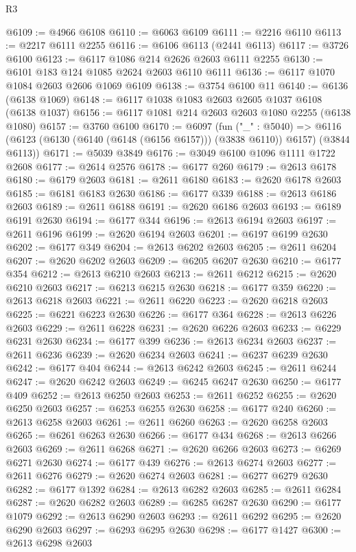 \begin{lexlean}{R3}
\begin{coremodule}
@6109 := @4966 @6108
@6110 := @6063 @6109
@6111 := @2216 @6110
@6113 := @2217 @6111 @2255
@6116 := @6106 @6113 (@2441 @6113)
@6117 := @3726 @6100
@6123 := @6117 @1086 @214 @2626 @2603 @6111 @2255
@6130 := @6101 @183 @124 @1085 @2624 @2603 @6110 @6111
@6136 := @6117 @1070 @1084 @2603 @2606 @1069 @6109
@6138 := @3754 @6100 @11
@6140 := @6136 (@6138 @1069)
@6148 := @6117 @1038 @1083 @2603 @2605 @1037 @6108 (@6138 @1037)
@6156 := @6117 @1081 @214 @2603 @2603 @1080 @2255 (@6138 @1080)
@6157 := @3760 @6100
@6170 := @6097
    (fun ("_" : @5040) =>
    @6116 (@6123 (@6130 (@6140 (@6148 (@6156 @6157))) (@3838 @6110)) @6157) (@3844 @6113))
@6171 := @5039 @3849
@6176 := @3049 @6100 @1096 @1111 @1722 @2608
@6177 := @2614 @2576
@6178 := @6177 @260
@6179 := @2613 @6178
@6180 := @6179 @2603
@6181 := @2611 @6180
@6183 := @2620 @6178 @2603
@6185 := @6181 @6183 @2630
@6186 := @6177 @339
@6188 := @2613 @6186 @2603
@6189 := @2611 @6188
@6191 := @2620 @6186 @2603
@6193 := @6189 @6191 @2630
@6194 := @6177 @344
@6196 := @2613 @6194 @2603
@6197 := @2611 @6196
@6199 := @2620 @6194 @2603
@6201 := @6197 @6199 @2630
@6202 := @6177 @349
@6204 := @2613 @6202 @2603
@6205 := @2611 @6204
@6207 := @2620 @6202 @2603
@6209 := @6205 @6207 @2630
@6210 := @6177 @354
@6212 := @2613 @6210 @2603
@6213 := @2611 @6212
@6215 := @2620 @6210 @2603
@6217 := @6213 @6215 @2630
@6218 := @6177 @359
@6220 := @2613 @6218 @2603
@6221 := @2611 @6220
@6223 := @2620 @6218 @2603
@6225 := @6221 @6223 @2630
@6226 := @6177 @364
@6228 := @2613 @6226 @2603
@6229 := @2611 @6228
@6231 := @2620 @6226 @2603
@6233 := @6229 @6231 @2630
@6234 := @6177 @399
@6236 := @2613 @6234 @2603
@6237 := @2611 @6236
@6239 := @2620 @6234 @2603
@6241 := @6237 @6239 @2630
@6242 := @6177 @404
@6244 := @2613 @6242 @2603
@6245 := @2611 @6244
@6247 := @2620 @6242 @2603
@6249 := @6245 @6247 @2630
@6250 := @6177 @409
@6252 := @2613 @6250 @2603
@6253 := @2611 @6252
@6255 := @2620 @6250 @2603
@6257 := @6253 @6255 @2630
@6258 := @6177 @240
@6260 := @2613 @6258 @2603
@6261 := @2611 @6260
@6263 := @2620 @6258 @2603
@6265 := @6261 @6263 @2630
@6266 := @6177 @434
@6268 := @2613 @6266 @2603
@6269 := @2611 @6268
@6271 := @2620 @6266 @2603
@6273 := @6269 @6271 @2630
@6274 := @6177 @439
@6276 := @2613 @6274 @2603
@6277 := @2611 @6276
@6279 := @2620 @6274 @2603
@6281 := @6277 @6279 @2630
@6282 := @6177 @1392
@6284 := @2613 @6282 @2603
@6285 := @2611 @6284
@6287 := @2620 @6282 @2603
@6289 := @6285 @6287 @2630
@6290 := @6177 @1079
@6292 := @2613 @6290 @2603
@6293 := @2611 @6292
@6295 := @2620 @6290 @2603
@6297 := @6293 @6295 @2630
@6298 := @6177 @1427
@6300 := @2613 @6298 @2603

\end{coremodule}
\end{lexlean}
